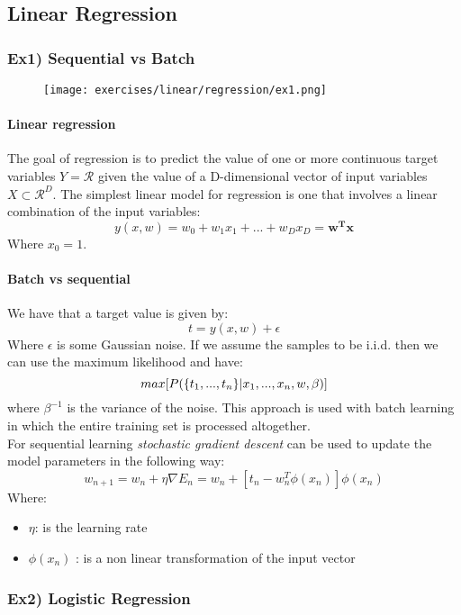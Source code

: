 \subsection{Linear Regression}

\subsubsection{Ex1) Sequential vs Batch }

\begin{figure}[H]
    \centering
    \texttt{[image: exercises/linear/regression/ex1.png]}
\end{figure}
 

\paragraph{Linear regression}
The goal of regression is to predict the value of one or more continuous target variables $Y=\mathcal{R}$ given the value of a D-dimensional vector of input variables $X \subset \mathcal{R}^D$. The simplest linear model for regression is one that involves a linear combination of the input variables:
\[y(x,w)=w_0+w_1x_1+...+w_Dx_D=\bm{w^Tx}\]
Where $x_0=1$.

\paragraph{Batch vs sequential}


We have that a target value is given by:
\[t=y(x,w) + \epsilon\]
Where $\epsilon$ is some Gaussian noise. If we assume the samples to be i.i.d. then we can use the maximum likelihood and have:
\[max[P(\lbrace{t_1,...,t_n}\rbrace|x_1,...,x_n,w,\beta)]\]
where $\beta^{-1}$ is the variance of the noise. This approach is used with batch learning in which the entire training set is processed altogether.\\

For sequential learning \textit{stochastic gradient descent} can be used to update the model parameters in the following way:
\[w_{n+1}=w_n+\eta \nabla E_n= w_n +[t_n -w_n^T \phi(x_n)]\phi(x_n)\]
Where:
\begin{itemize}
\item $\eta$: is the learning rate 
\item $\phi(x_n)$ : is a non linear transformation of the input vector
\end{itemize}

\subsubsection{Ex2) Logistic Regression }

